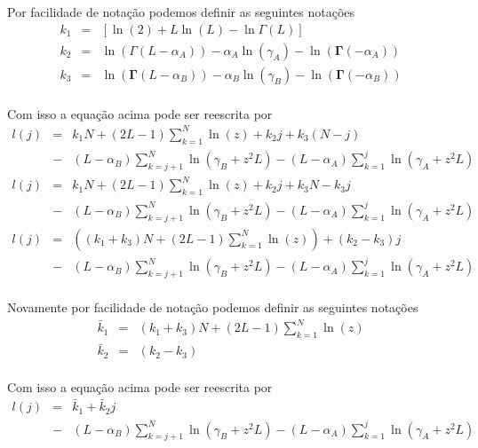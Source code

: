 Por facilidade de notação podemos definir as seguintes notações
$$
\begin{array}{lcl}
	k_1&=& \left[\ln{(2)}+L\ln{(L)}-\ln{\Gamma(L)}\right]\\
	k_2&=& \ln{(\Gamma(L-\alpha_{A}))}-\alpha_{A}\ln{(\gamma_{A})} -\ln{(\mathbf{\Gamma}(-\alpha_{A}))}\\
	k_3&=& \ln{(\mathbf{\Gamma}(L-\alpha_{B}))}-\alpha_{B}\ln{(\gamma_{B})} -\ln{(\mathbf{\Gamma}(-\alpha_{B}))}\\
\end{array}
$$

Com isso a equação acima pode ser reescrita por
\begin{equation*}
\begin{array}{rcl}
	l(j)&=&k_1N+(2L-1)\sum_{k=1}^{N}\ln{(z)} +k_2j+k_3(N-j) \\
	&-&(L-\alpha_{B})\sum_{k=j+1}^{N}\ln{(\gamma_{B}+z^2L)}-(L-\alpha_{A})\sum_{k=1}^{j}\ln{(\gamma_{A}+z^2L)}\\
	l(j)&=&k_1N+(2L-1)\sum_{k=1}^{N}\ln{(z)} +k_2j+k_3N-k_3j \\
	&-&(L-\alpha_{B})\sum_{k=j+1}^{N}\ln{(\gamma_{B}+z^2L)}-(L-\alpha_{A})\sum_{k=1}^{j}\ln{(\gamma_{A}+z^2L)}\\
        l(j)&=&\left((k_1+k_3)N+(2L-1)\sum_{k=1}^{N}\ln{(z)}\right) +(k_2-k_3)j \\
	&-&(L-\alpha_{B})\sum_{k=j+1}^{N}\ln{(\gamma_{B}+z^2L)}-(L-\alpha_{A})\sum_{k=1}^{j}\ln{(\gamma_{A}+z^2L)}\\
\end{array}
\end{equation*}

Novamente por facilidade de notação podemos definir as seguintes notações
$$
\begin{array}{lcl}
    \bar{k}_1&=&(k_1+k_3)N+(2L-1)\sum_{k=1}^{N}\ln{(z)} \\
	\bar{k}_2&=& (k_2-k_3)\\
\end{array}
$$

Com isso a equação acima pode ser reescrita por
\begin{equation}\label{eqn128}
\begin{array}{rcl}
	l(j)&=&\bar{k}_1 +\bar{k}_2j \\
	&-&(L-\alpha_{B})\sum_{k=j+1}^{N}\ln{(\gamma_{B}+z^2L)}-(L-\alpha_{A})\sum_{k=1}^{j}\ln{(\gamma_{A}+z^2L)}\\
\end{array}
\end{equation}

